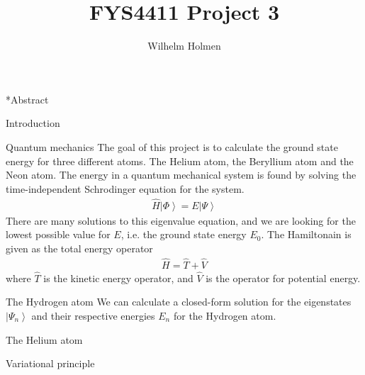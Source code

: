 \documentclass[a4paper, 12pt, titlepage]{article}
\author{Wilhelm Holmen}
\title{FYS4411 Project 3}
\begin{document}
 \maketitle
 \newpage

 \tableofcontents

 \newpage

\begin{subsection}*{Abstract}
	
\end{subsection}

\begin{section}{Introduction}
	
\end{section}

\begin{section}{Quantum mechanics}
 The goal of this project is to calculate the ground state energy for three different atoms. The Helium atom, the Beryllium atom and the Neon atom. The energy in a quantum mechanical system is found by solving the time-independent Schrodinger equation for the system. 
 \begin{align}
 	\hat H \left| \Phi \right> = E \left| \Psi \right>
 \end{align}
 There are many solutions to this eigenvalue equation, and we are looking for the lowest possible value for $E$, i.e. the ground state energy $E_0$. The Hamiltonain is given as the total energy operator
 \begin{align}
 	\hat H = \hat T + \hat V
 \end{align}
 where $\hat T$ is the kinetic energy operator, and $\hat V$ is the operator for potential energy.  

 \begin{subsection}{The Hydrogen atom}
 We can calculate a closed-form solution for the eigenstates $\left| \Psi_n \right> $ and their respective energies $E_n$ for the Hydrogen atom.  
 \end{subsection}

 \begin{subsection}{The Helium atom}
 	
 \end{subsection}

 \begin{subsection}{Variational principle}
 	
 \end{subsection}


\end{section}
\newpage
\end{document}
